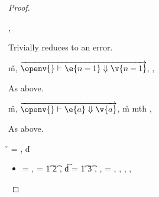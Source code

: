 \begin{lemma}
\begin{proof}
\begin{case}[B-Method]
\end{case}

\begin{case}[BE-Method1]
  \opsem {\openv{}}
         {}
         {\errorval{\v{}}},
  \opsem {\openv{}}
         {\e{}}
         {\errorval{\v{}}}

         Trivially reduces to an error.
\end{case}
\begin{case}[BE-Method2]
  \opsem {\openv{}}
         {}
         {\v{m}},
 $\overrightarrow{
  \opsem {\openv{}}
         {\e{n-1}}
         {\v{n-1}}
       }$,
  \opsem {\openv{}}
         {}
         {\errorval{\v{}}},
  \opsem {\openv{}}
         {\e{}}
         {\errorval{\v{}}}

  As above.
\end{case}
\begin{case}[BE-Method3]
  \opsem {\openv{}}
         {}
         {\v{m}},
  $\overrightarrow{
  \opsem {\openv{}}
         {\e{a}}
         {\v{a}}
       }$,
   {\v{m}} {mth}
                    {} {}
                    {}
                    {\errorvalv{}},
  \opsem {\openv{}} {\e{}} {\errorvalv{}}

  As above.

\end{case}

\begin{case}[B-DefMulti]
  \v{} = { {\emptydisptable}},
  \opsem {\openv{}} {} {\v{d}}



\begin{itemize}
  \item[]
\begin{subcase}[T-DefMulti]
  \ep{} = {\createmultiexp {\s{}} {}},
  \s{} = {\ArrowOne {\x{}} {\t{1}} {\t{2}}
                          {
                                      {}}
                          {}},
  \t{d} = {\ArrowOne {\x{}} {\t{1}} {\t{3}}
                          {
                                      {}}
                          {}},
\judgementtworewrite {\propenv{}} {\ep{}} {\sp{}} {\e{}},
  \e{} = {\createmultiexp {\s{}} {}},
  ,
  \inpropenv{\topprop{}}{\thenprop{\prop{}}},
  \inpropenv{\botprop{}}{\elseprop{\prop{}}},
  \issubobjin{}{\emptyobject{}}{\object{}}



\end{subcase}
\end{itemize}
\end{case}
\end{proof}
\end{lemma}
